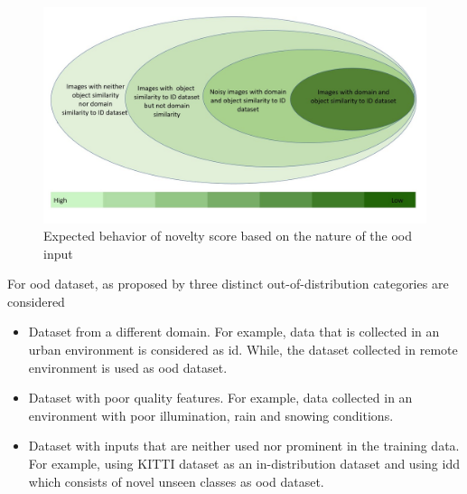         \begin{figure}[H]
            \centering
            \includegraphics[scale=0.39]{images/Slide2.jpg}
            \caption[Novelty Score behavior]{Expected behavior of novelty score based on the nature of the \acrshort{ood} input}
            \label{fig:OD2_features}
        \end{figure}
        
        For \acrshort{ood} dataset, as proposed by \citet{Cao2020} three distinct out-of-distribution categories are considered
        \begin{itemize}
            \item Dataset from a different domain. For example, data that is collected in an urban environment is considered as \acrshort{id}. While, the dataset collected in remote environment is used as \acrshort{ood} dataset.
            \item Dataset with poor quality features. For example, data collected in an environment with poor illumination, rain and snowing conditions.
            \item Dataset with inputs that are neither used nor prominent in the training data. For example, using KITTI dataset \citep{KITTI2012} as an in-distribution dataset and using \acrshort{idd} \citep{Varma2019IDDAD} which consists of novel unseen classes as \acrshort{ood} dataset.
        \end{itemize}

